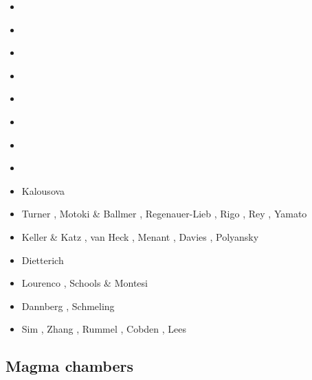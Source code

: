 \begin{scriptsize}
\begin{itemize}
\item[\twothousandsix] \cite{onmm06}
\item[\twothousandseven] \cite{srrb07}\cite{mohb07}\cite{elki07}\cite{copb07}
\item[\twothousandeight] \cite{hets08}\cite{hest08}
\item[\twothousandnine] \cite{bavi09}
\item[\twothousandten] \cite{baiv10}\cite{habl10}\cite{cows10}\cite{dekc10}
\item[\twothousandeleven] \cite{baiv11}\cite{zhgy11}\cite{zhgh11}\cite{bics11}\cite{mobh11}
\item[\twothousandtwelve] \cite{yatd12}\cite{kasc12b}\cite{ullc12}
\item[\twothousandthirteen] \cite{kemk13}\cite{mofm13}\cite{mowe13}
\item[\twothousandfourteen] Kalousova \etal \cite{kast14}
\item[\twothousandfifteen] Turner \etal \cite{tukb15}, Motoki \& Ballmer \cite{moba15},
                           Regenauer-Lieb \etal \cite{rerl15}, Rigo \etal \cite{riag15},
                           Rey \cite{rey15}, Yamato \etal \cite{yadm15}
\item[\twothousandsixteen] Keller \& Katz \cite{keka16}, van Heck \etal \cite{vade16},
                           Menant \etal \cite{mesj16}, Davies \etal \cite{dalg16},
                           Polyansky \etal \cite{porb16} 
\item[\twothousandseventeen] Dietterich \etal \cite{dilc17}
\item[\twothousandeighteen] Lourenco \etal \cite{lorg18}, Schools \& Montesi \cite{scmo18}
\item[\twothousandnineteen] Dannberg \etal \cite{dagg19}, Schmeling \etal \cite{scmw19}
\item[\twothousandtwenty] Sim \etal \cite{siss20}, Zhang \etal \cite{zhbp20}, 
                          Rummel \etal \cite{rubk20,rukb20}, Cobden \cite{cobd20},
                          Lees \etal \cite{lerm20}
\end{itemize}
\end{scriptsize}

\subsection{Magma chambers}

